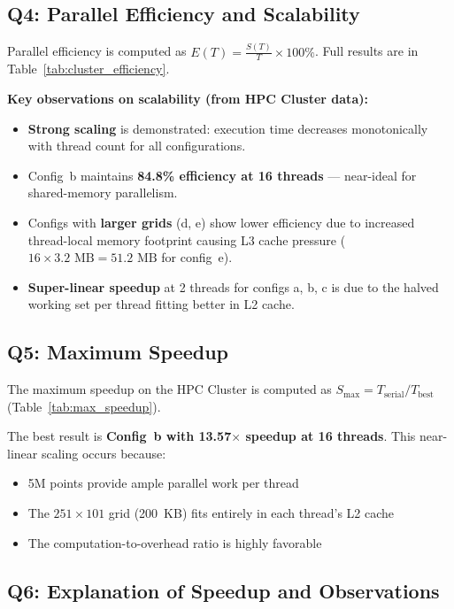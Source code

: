 \documentclass[12pt,a4paper]{article}
\begin{document}
\subsection{Q4: Parallel Efficiency and Scalability}

Parallel efficiency is computed as $E(T) = \frac{S(T)}{T} \times 100\%$. Full results are in Table~\ref{tab:cluster_efficiency}.

\textbf{Key observations on scalability (from HPC Cluster data):}
\begin{itemize}
    \item \textbf{Strong scaling} is demonstrated: execution time decreases monotonically with thread count for all configurations.
    \item Config~b maintains \textbf{84.8\% efficiency at 16 threads} --- near-ideal for shared-memory parallelism.
    \item Configs with \textbf{larger grids} (d, e) show lower efficiency due to increased thread-local memory footprint causing L3 cache pressure ($16 \times 3.2\text{ MB} = 51.2\text{ MB}$ for config~e).
    \item \textbf{Super-linear speedup} at 2 threads for configs a, b, c is due to the halved working set per thread fitting better in L2 cache.
\end{itemize}

\subsection{Q5: Maximum Speedup}

The maximum speedup on the HPC Cluster is computed as $S_{\max} = T_{\text{serial}} / T_{\text{best}}$ (Table~\ref{tab:max_speedup}).

The best result is \textbf{Config~b with 13.57$\times$ speedup at 16 threads}. This near-linear scaling occurs because:
\begin{itemize}
    \item 5M points provide ample parallel work per thread
    \item The $251 \times 101$ grid (200~KB) fits entirely in each thread's L2 cache
    \item The computation-to-overhead ratio is highly favorable
\end{itemize}

\subsection{Q6: Explanation of Speedup and Observations}
\end{document}
